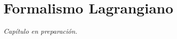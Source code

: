 \documentclass[../apunte_mecanica_clasica.tex]{subfiles}%
\begin{document}
\chapter{Formalismo Lagrangiano}


\begin{center}
\vspace{1cm}
\textit{Capítulo en preparación.}
\end{center}
\end{document}
